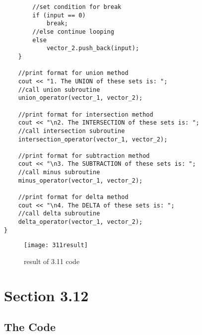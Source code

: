 \documentclass[11pt]{article}
\begin{document}
\begin{lstlisting}
        //set condition for break
        if (input == 0)
            break;
        //else continue looping
        else
            vector_2.push_back(input);
    }

    //print format for union method
    cout << "1. The UNION of these sets is: ";
    //call union subroutine
    union_operator(vector_1, vector_2);

    //print format for intersection method
    cout << "\n2. The INTERSECTION of these sets is: ";
    //call intersection subroutine
    intersection_operator(vector_1, vector_2);

    //print format for subtraction method
    cout << "\n3. The SUBTRACTION of these sets is: ";
    //call minus subroutine
    minus_operator(vector_1, vector_2);

    //print format for delta method
    cout << "\n4. The DELTA of these sets is: ";
    //call delta subroutine
    delta_operator(vector_1, vector_2);
}
\end{lstlisting}

\begin{figure}
    \centering
    \texttt{[image: 311result]}
    \caption{result of 3.11 code}
    \label{fig:my_label}
\end{figure}


\section*{Section 3.12}

\subsection*{The Code}
\end{document}
